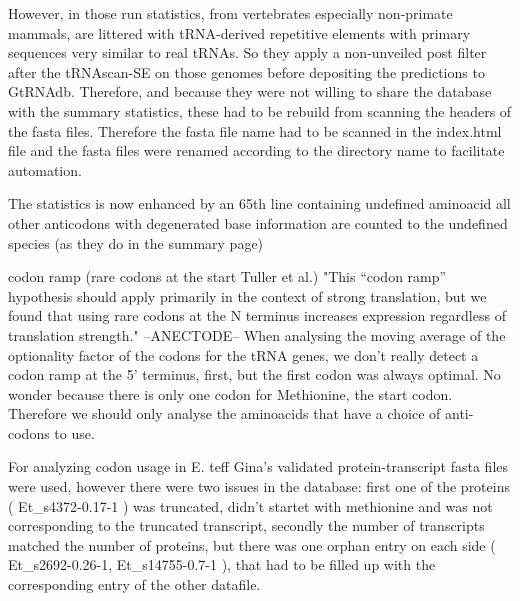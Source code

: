 However, in those run statistics, from vertebrates especially non-primate mammals, are littered with tRNA-derived repetitive elements with primary sequences very similar to real tRNAs. So they apply a non-unveiled post filter after the tRNAscan-SE on those genomes before depositing the predictions to GtRNAdb. Therefore, and because they were not willing to share the database with the summary statistics, these had to be rebuild from scanning the headers of the fasta files. Therefore the fasta file name had to be scanned in the index.html file and the fasta files were renamed according to the directory name to facilitate automation. 

The statistics is now enhanced by an 65th line containing undefined aminoacid all other anticodons with degenerated base information are counted to the undefined species (as they do in the summary page)

codon ramp (rare codons at the start Tuller et al.) "This “codon ramp” hypothesis should apply primarily in the context of strong translation, but we found that using rare codons at the N terminus increases expression regardless of translation strength." --ANECTODE-- When analysing the moving average of the optionality factor of the codons for the tRNA genes, we don't really detect a codon ramp at the 5' terminus, first, but the first codon was always optimal. No wonder because there is only one codon for Methionine, the start codon. Therefore we should only analyse the aminoacids that have a choice of anti-codons to use.  

For analyzing codon usage in E. teff Gina's validated protein-transcript fasta files were used, however there were two issues in the database: 
first one of the proteins (
Et\_s4372-0.17-1
) was truncated, didn't startet with methionine and was not corresponding to the truncated transcript, secondly the number of transcripts matched the number of proteins, but there was one orphan entry on each side (
Et\_s2692-0.26-1, Et\_s14755-0.7-1
), that had to be filled up with the corresponding entry of the other datafile. 


